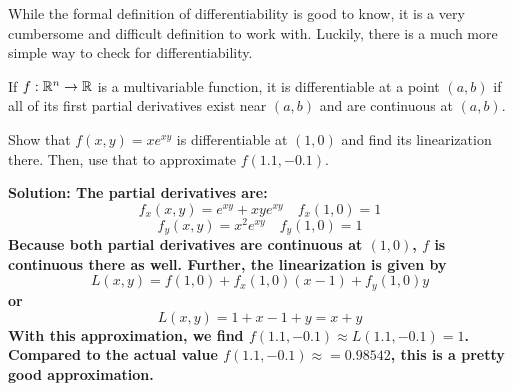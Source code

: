 While the formal definition of differentiability is good to know, it is a very cumbersome and difficult definition to work with. Luckily, there is a much more simple way to check for differentiability.
\begin{theorem}
    If \(f: \mathbb{R}^n\to \mathbb{R}\) is a multivariable function, it is differentiable at a point \((a,b)\) if all of its first partial derivatives exist near \((a,b)\) and are continuous at \((a,b)\).
\end{theorem}
\begin{example}
    Show that \(f(x,y)=xe^{xy}\) is differentiable at \((1, 0)\) and find its linearization there. Then, use that to approximate \(f(1.1, -0.1)\).
    \par\bf{Solution: }The partial derivatives are:
    \[ f_x(x,y) = e^{xy}+xye^{xy}\quad f_x(1, 0) = 1\]
    \[ f_y(x,y) = x^2e^{xy} \quad f_y(1,0) = 1\]
    Because both partial derivatives are continuous at \((1, 0)\), \(f\) is continuous there as well. Further, the linearization is given by
    \[ L(x,y) = f(1, 0) + f_x(1,0)(x-1) + f_y(1,0)y \]
    or
   \[ L(x,y) = 1 + x - 1 + y = x + y\]
   With this approximation, we find \( f(1.1, -0.1)\approx L(1.1, -0.1) = 1 \). Compared to the actual value \(f(1.1, -0.1) \approx =0.98542\), this is a pretty good approximation.
\end{example}
